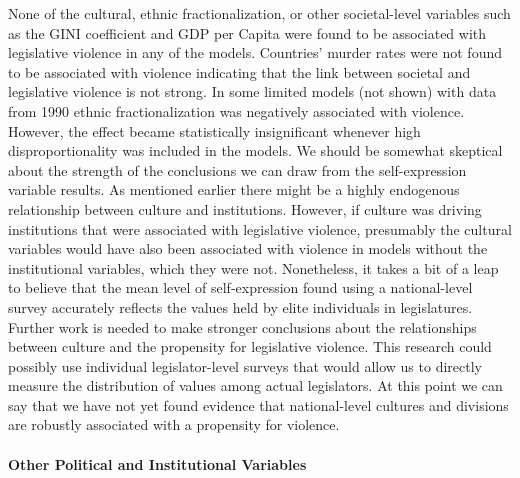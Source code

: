 \documentclass[a4paper]{article}\usepackage[]{graphicx}\usepackage[]{color}
\begin{document}
None of the cultural, ethnic fractionalization, or other societal-level variables such as the GINI coefficient and GDP per Capita were found to be associated with legislative violence in any of the models. Countries' murder rates were not found to be associated with violence indicating that the link between societal and legislative violence is not strong. In some limited models (not shown) with data from 1990 ethnic fractionalization was negatively associated with violence. However, the effect became statistically insignificant whenever high disproportionality was included in the models. We should be somewhat skeptical about the strength of the conclusions we can draw from the self-expression variable results. As mentioned earlier there might be a highly endogenous relationship between culture and institutions. However, if culture was driving institutions that were associated with legislative violence, presumably the cultural variables would have also been associated with violence in models without the institutional variables, which they were not. Nonetheless, it takes a bit of a leap to believe that the mean level of self-expression found using a national-level survey accurately reflects the values held by elite individuals in legislatures. Further work is needed to make stronger conclusions about the relationships between culture and the propensity for legislative violence. This research could possibly use individual legislator-level surveys that would allow us to directly measure the distribution of values among actual legislators. At this point we can say that we have not yet found evidence that national-level cultures and divisions are robustly associated with a propensity for violence.

\paragraph{Other Political and Institutional Variables}
\end{document}
